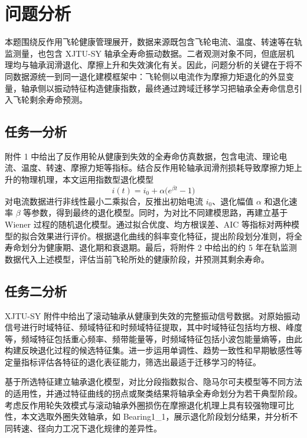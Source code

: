 \section{问题分析}

本题围绕反作用飞轮健康管理展开，数据来源既包含飞轮电流、温度、转速等在轨监测量，也包含 XJTU-SY 轴承全寿命振动数据。二者观测对象不同，但底层机理均与轴承润滑退化、摩擦上升和失效演化有关。因此，问题分析的关键在于将不同数据源统一到同一退化建模框架中：飞轮侧以电流作为摩擦力矩退化的外显变量，轴承侧以振动特征构造健康指数，最终通过跨域迁移学习把轴承全寿命信息引入飞轮剩余寿命预测。

\subsection{任务一分析}

附件 1 中给出了反作用轮从健康到失效的全寿命仿真数据，包含电流、理论电流、温度、转速、摩擦力矩等指标。结合反作用轮轴承润滑剂损耗导致摩擦力矩上升的物理机理，本文运用指数型退化模型
\begin{equation}
  i(t)=i_0+\alpha\bigl(e^{\beta t}-1\bigr)
\end{equation}
对电流数据进行非线性最小二乘拟合，反推出初始电流 $i_0$、退化幅值 $\alpha$ 和退化速率 $\beta$ 等参数，得到最终的退化模型。同时，为对比不同建模思路，再建立基于 Wiener 过程的随机退化模型。通过拟合优度、均方根误差、AIC 等指标对两种模型的拟合效果进行评价。根据退化曲线的斜率变化特征，提出阶段划分准则，将全寿命划分为健康期、退化期和衰退期。最后，将附件 2 中给出的约 5 年在轨监测数据代入上述模型，评估当前飞轮所处的健康阶段，并预测其剩余寿命。

\subsection{任务二分析}

XJTU-SY 附件中给出了滚动轴承从健康到失效的完整振动信号数据。对原始振动信号进行时域特征、频域特征和时频域特征提取，其中时域特征包括均方根、峰度等，频域特征包括重心频率、频带能量等，时频域特征包括小波包能量熵等，由此构建反映退化过程的候选特征集。进一步运用单调性、趋势一致性和早期敏感性等定量指标评估各特征的退化表征能力，筛选出最适于迁移学习的特征。

基于所选特征建立轴承退化模型，对比分段指数拟合、隐马尔可夫模型等不同方法的适用性，并通过特征曲线的拐点或聚类结果将轴承全寿命划分为若干典型阶段。考虑反作用轮失效模式与滚动轴承外圈损伤在摩擦退化机理上具有较强物理可比性，本文选取外圈失效轴承，如 Bearing1\_1，展示退化阶段划分结果，并分析不同转速、径向力工况下退化规律的差异性。

